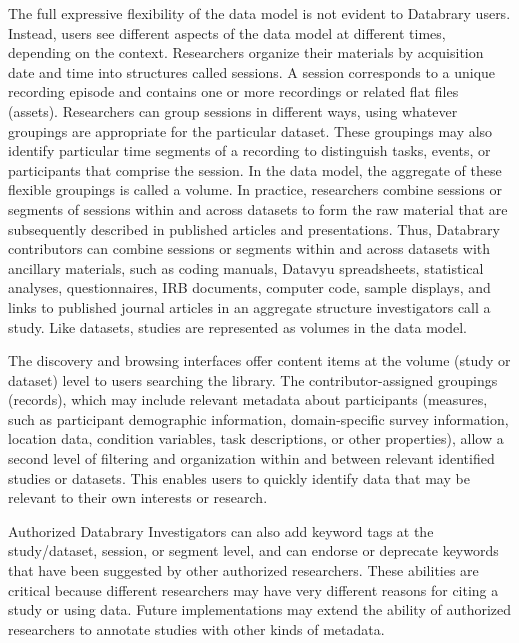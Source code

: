 \documentclass{sig-alternate}
\begin{document}
The full expressive flexibility of the data model is not evident to
Databrary users. Instead, users see different aspects of the data model
at different times, depending on the context. Researchers organize their
materials by acquisition date and time into structures called sessions.
A session corresponds to a unique recording episode and contains one or
more recordings or related flat files (assets). Researchers can group
sessions in different ways, using whatever groupings are appropriate for
the particular dataset. These groupings may also identify particular
time segments of a recording to distinguish tasks, events, or
participants that comprise the session. In the data model, the aggregate
of these flexible groupings is called a volume. In practice, researchers
combine sessions or segments of sessions within and across datasets to
form the raw material that are subsequently described in published
articles and presentations. Thus, Databrary contributors can combine
sessions or segments within and across datasets with ancillary
materials, such as coding manuals, Datavyu spreadsheets, statistical
analyses, questionnaires, IRB documents, computer code, sample displays,
and links to published journal articles in an aggregate structure
investigators call a study. Like datasets, studies are represented as
volumes in the data model.

The discovery and browsing interfaces offer content items at the volume
(study or dataset) level to users searching the library. The
contributor-assigned groupings (records), which may include relevant
metadata about participants (measures, such as participant demographic
information, domain-specific survey information, location data,
condition variables, task descriptions, or other properties), allow a
second level of filtering and organization within and between relevant
identified studies or datasets. This enables users to quickly identify
data that may be relevant to their own interests or research.

Authorized Databrary Investigators can also add keyword tags at the
study/dataset, session, or segment level, and can endorse or deprecate
keywords that have been suggested by other authorized researchers. These
abilities are critical because different researchers may have very
different reasons for citing a study or using data. Future
implementations may extend the ability of authorized researchers to
annotate studies with other kinds of metadata.
\end{document}
